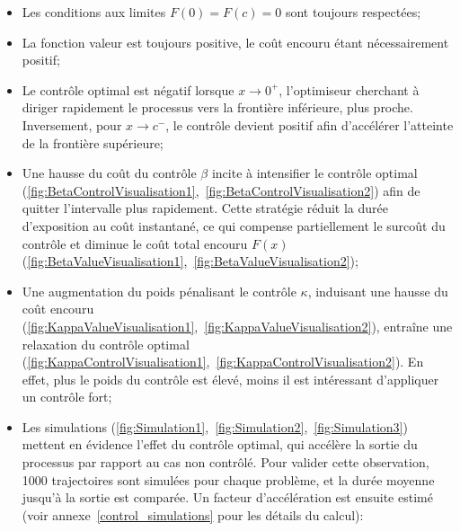 \begin{itemize}
    \item Les conditions aux limites $F(0)=F(c)=0$ sont toujours respectées;
    \item La fonction valeur est toujours positive, le coût encouru étant nécessairement positif;
    \item Le contrôle optimal est négatif lorsque \( x \to 0^+ \), l'optimiseur cherchant à diriger rapidement le processus vers la frontière inférieure, plus proche. Inversement, pour \( x \to c^-\), le contrôle devient positif afin d'accélérer l'atteinte de la frontière supérieure;
    \item Une hausse du coût du contrôle $\beta$ incite à intensifier le contrôle optimal (\ref{fig:BetaControlVisualisation1},~\ref{fig:BetaControlVisualisation2}) afin de quitter l'intervalle plus rapidement. Cette stratégie réduit la durée d'exposition au coût instantané, ce qui compense partiellement le surcoût du contrôle et diminue le coût total encouru $F(x)$ (\ref{fig:BetaValueVisualisation1},~\ref{fig:BetaValueVisualisation2});
    \item Une augmentation du poids pénalisant le contrôle $\kappa$, induisant une hausse du coût encouru (\ref{fig:KappaValueVisualisation1},~\ref{fig:KappaValueVisualisation2}), entraîne une relaxation du contrôle optimal (\ref{fig:KappaControlVisualisation1},~\ref{fig:KappaControlVisualisation2}). En effet, plus le poids du contrôle est élevé, moins il est intéressant d'appliquer un contrôle fort;
    \item Les simulations (\ref{fig:Simulation1},~\ref{fig:Simulation2},~\ref{fig:Simulation3}) mettent en évidence l'effet du contrôle optimal, qui accélère la sortie du processus par rapport au cas non contrôlé. Pour valider cette observation, 1000 trajectoires sont simulées pour chaque problème, et la durée moyenne jusqu'à la sortie est comparée. Un facteur d'accélération est ensuite estimé (voir annexe~\ref{control_simulations} pour les détails du calcul):

\end{itemize}
